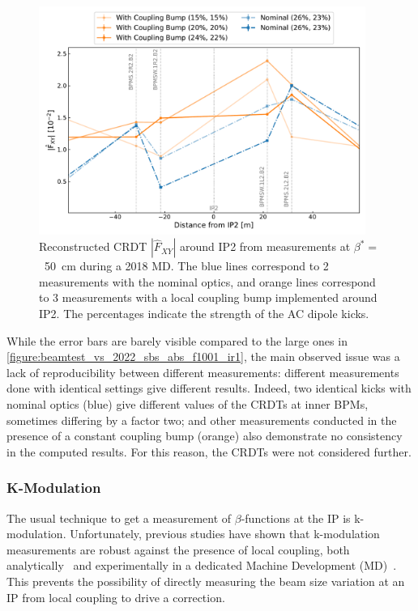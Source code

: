 \begin{figure}[!htb]
    \centering
    \includegraphics*[width=0.95\textwidth]{Figures/IR_Coupling_Correction/crdt_fxy_nominal_vs_colin_md_2018.pdf}
    \caption{Reconstructed CRDT \(|\hat{F}_{XY}|\) around IP\num{2} from measurements at \(\beta^{\ast} =\)~\qty{50}{\centi\meter} during a \num{2018} MD. The \textcolor{mplblue}{blue} lines correspond to \num{2} measurements with the nominal optics, and \textcolor{mplorange}{orange} lines correspond to \num{3} measurements with a local coupling bump implemented around IP\num{2}. The percentages indicate the strength of the AC dipole kicks.}
    \label{figure:crdt_fxy_nominal_vs_colin_md_2018}
\end{figure}

While the error bars are barely visible compared to the large ones in \cref{figure:beamtest_vs_2022_sbs_abs_f1001_ir1}, the main observed issue was a lack of reproducibility between different measurements: different measurements done with identical settings give different results.
Indeed, two identical kicks with nominal optics (\textcolor{mplblue}{blue}) give different values of the CRDTs at inner BPMs, sometimes differing by a factor two; and other measurements conducted in the presence of a constant coupling bump (\textcolor{mplorange}{orange}) also demonstrate no consistency in the computed results.
For this reason, the CRDTs were not considered further.

\subsubsection*{K-Modulation}

The usual technique to get a measurement of \(\beta\)-functions at the IP is k-modulation.
Unfortunately, previous studies have shown that k-modulation measurements are robust against the presence of local coupling, both analytically~\cite{PRAB:Hofer:Coupling_Local_Observables, PRAB:Carlier:KModulation_HiLumi} and experimentally in a dedicated Machine Development (MD)~\cite{CERN:Persson:Local_Coupling_IP}.
This prevents the possibility of directly measuring the beam size variation at an IP from local coupling to drive a correction. 
\newline

